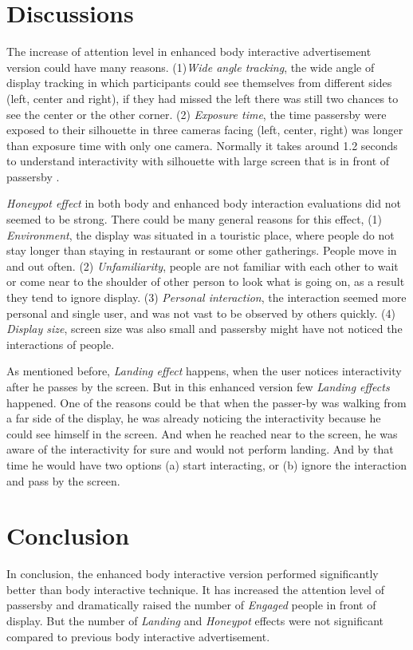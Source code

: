\section{Discussions}
The increase of attention level in enhanced body interactive advertisement version could have many reasons. (1)\emph{Wide angle tracking}, the wide angle of display tracking in which participants could see themselves from different sides (left, center and right), if they had missed the left there was still two chances to see the center or the other corner. (2) \emph{Exposure time}, the time passersby were exposed to their silhouette in three cameras facing (left, center, right) was longer than exposure time with only one camera. Normally it takes around 1.2 seconds to understand interactivity with silhouette with large screen that is in front of passersby \cite{ LookingGlass}.

\emph{Honeypot effect} in both body and enhanced body interaction evaluations did not seemed to be strong. There could be many general reasons for this effect, (1) \emph{Environment}, the display was situated in a touristic place, where people do not stay longer than staying in restaurant or some other gatherings. People move in and out often. (2) \emph{Unfamiliarity}, people are not familiar with each other to wait or come near to the shoulder of other person to look what is going on, as a result they tend to ignore display. (3) \emph{Personal interaction}, the interaction seemed more personal and single user,  and was not vast to be observed by others quickly. (4) \emph{Display size}, screen size was also small and passersby might have not noticed the interactions of people.

As mentioned before, \emph{Landing effect} happens, when the user notices interactivity after he passes by the screen. But in this enhanced version few \emph{Landing effects} happened. One of the reasons could be that when the passer-by was walking from a far side of the display, he was already noticing the interactivity because he could see himself in the screen. And when he reached near to the screen, he was aware of the interactivity for sure and would not perform landing. And by that time he would have two options (a) start interacting, or (b) ignore the interaction and pass by the screen.


\section{Conclusion}
In conclusion, the enhanced body interactive version performed significantly better than body interactive technique. It has increased the attention level of passersby and dramatically raised the number of \emph{Engaged} people in front of display. But the number of \emph{Landing} and \emph{Honeypot} effects were not significant compared to previous body interactive advertisement.

